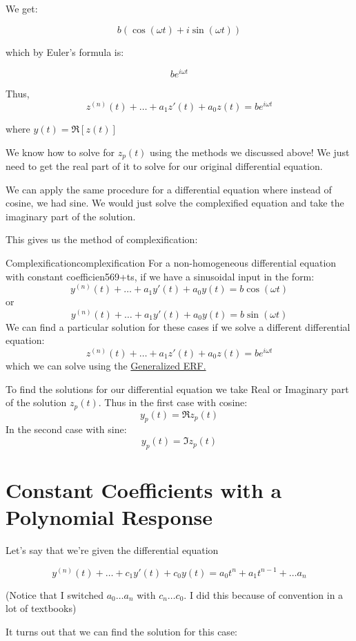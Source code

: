 \documentclass{report}
\begin{document}
We get:

$$b(\cos(\omega t) + i\sin(\omega t))$$

which by Euler's formula is:

$$be^{i\omega t}$$

Thus,
$$z^{(n)}(t) + \dots + a_1z'(t) + a_0z(t) = be^{i\omega t}$$

where $y(t) = \Re[z(t)]$

We know how to solve for $z_p(t)$ using the methods we discussed above! We just need to get the real part of it to solve for our original differential equation.

We can apply the same procedure for a differential equation where instead of cosine, we had sine. We would just solve the complexified equation and take the imaginary part of the solution.

This gives us the method of complexification:

\begin{mytheo}{Complexification}{complexification}
    For a non-homogeneous differential equation with constant coefficien569+ts, if we have a sinusoidal input in the form:
    $$y^{(n)}(t) + \dots + a_1y'(t) + a_0y(t) = b\cos(\omega t)$$
    or 
    $$y^{(n)}(t) + \dots + a_1y'(t) + a_0y(t) = b\sin(\omega t)$$
    We can find a particular solution for these cases if we solve a different differential equation:
    $$z^{(n)}(t) + \dots + a_1z'(t) + a_0z(t) = be^{i\omega t}$$
    which we can solve using the \hyperref[th:GERF]{Generalized ERF.}
    
    To find the solutions for our differential equation we take Real or Imaginary part of the solution $z_p(t)$. Thus in the first case with cosine:
    $$y_p(t) = \Re{z_p(t)}$$
    In the second case with sine:
    $$y_p(t) = \Im{z_p(t)}$$
\end{mytheo}

\section{Constant Coefficients with a Polynomial Response}
Let's say that we're given the differential equation

$$y^{(n)}(t) + \dots + c_1y'(t) + c_0y(t) = a_0t^n + a_1t^{n-1} + \dots a_n$$

(Notice that I switched $a_0 \dots a_n$ with $c_n \dots  c_0$. I did this because of convention in a lot of textbooks)

It turns out that we can find the solution for this case:
\end{document}
